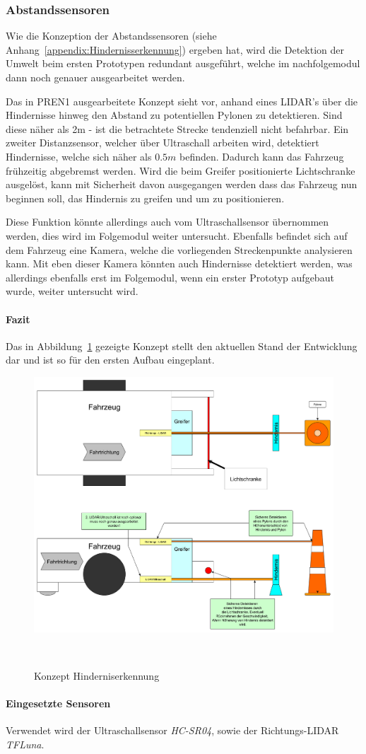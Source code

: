 \documentclass[main.tex]{subfiles} %
\begin{document}

\subsubsection{Abstandssensoren}

Wie die Konzeption der Abstandssensoren (siehe Anhang~\ref{appendix:Hindernisserkennung})
 ergeben hat, wird die Detektion der
Umwelt beim ersten Prototypen redundant ausgeführt, welche im nachfolgemodul
dann noch genauer ausgearbeitet werden.

Das in PREN1 ausgearbeitete Konzept sieht vor, anhand eines LIDAR's über die
Hindernisse hinweg den Abstand zu potentiellen Pylonen zu detektieren. Sind
diese näher als 2m - ist die betrachtete Strecke tendenziell nicht befahrbar.
Ein zweiter Distanzsensor, welcher über Ultraschall arbeiten wird, detektiert
Hindernisse, welche sich näher als $0.5 m$ befinden. Dadurch kann das Fahrzeug
frühzeitig abgebremst werden. Wird die beim Greifer positionierte Lichtschranke
ausgelöst, kann mit Sicherheit davon ausgegangen werden dass das Fahrzeug nun
beginnen soll, das Hindernis zu greifen und um zu positionieren.

Diese Funktion könnte allerdings auch vom Ultraschallsensor übernommen werden,
dies wird im Folgemodul weiter untersucht. Ebenfalls befindet sich auf dem
Fahrzeug eine Kamera, welche die vorliegenden Streckenpunkte analysieren kann.
Mit eben dieser Kamera könnten auch Hindernisse detektiert werden, was
allerdings ebenfalls erst im Folgemodul, wenn ein erster Prototyp aufgebaut
wurde, weiter untersucht wird.

\paragraph{Fazit} Das in Abbildung~\ref{fig:Konzept_Hinderniserkennung} gezeigte Konzept stellt
den aktuellen Stand der Entwicklung dar und ist so für den ersten Aufbau
eingeplant.

\begin{figure}[h!]
    \centering
    \includegraphics[width=0.75\linewidth]{./fig_Abstandssensor/Konzept_Hinderniserkennung.pdf}
    \caption{Konzept Hinderniserkennung}~\label{fig:Konzept_Hinderniserkennung}
\end{figure}

\paragraph{Eingesetzte Sensoren}
Verwendet wird der Ultraschallsensor \textit{HC-SR04}, sowie der
Richtungs-LIDAR \textit{TFLuna}.
\end{document}

